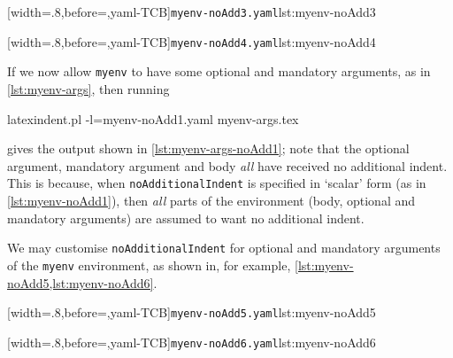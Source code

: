 \begin{minipage}{.45\textwidth}
[width=.8\linewidth,before=\centering,yaml-TCB]{\texttt{myenv-noAdd3.yaml}}{lst:myenv-noAdd3}
\end{minipage}
\hfill
\begin{minipage}{.45\textwidth}
[width=.8\linewidth,before=\centering,yaml-TCB]{\texttt{myenv-noAdd4.yaml}}{lst:myenv-noAdd4}
\end{minipage}


If we now allow \texttt{myenv} to have some optional and mandatory arguments, as in \cref{lst:myenv-args},
then running
\begin{commandshell}
latexindent.pl -l=myenv-noAdd1.yaml myenv-args.tex  
\end{commandshell}
gives the output shown in \cref{lst:myenv-args-noAdd1}; note that the optional argument, mandatory argument and body \emph{all} 
have received no additional indent. This is because, when \texttt{noAdditionalIndent} is specified in `scalar' form (as in \cref{lst:myenv-noAdd1}), 
then \emph{all} parts of the environment (body, optional and mandatory arguments) are assumed to want no additional indent.

We may customise \texttt{noAdditionalIndent} for optional and mandatory arguments of the \texttt{myenv} environment, as shown in, for example, \cref{lst:myenv-noAdd5,lst:myenv-noAdd6}.

\begin{minipage}{.49\textwidth}
[width=.8\linewidth,before=\centering,yaml-TCB]{\texttt{myenv-noAdd5.yaml}}{lst:myenv-noAdd5}
\end{minipage}
\hfill
\begin{minipage}{.49\textwidth}
[width=.8\linewidth,before=\centering,yaml-TCB]{\texttt{myenv-noAdd6.yaml}}{lst:myenv-noAdd6}
\end{minipage}

